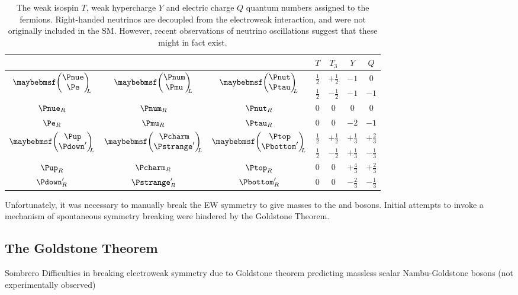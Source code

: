 \begin{table}
	\begin{tabular}{ccc@{\hskip 1cm}cccc}
		& & & $T$ & $T_3$ & $Y$ & $Q$ \\
		\hline
		\multirow{2}{*}{$\colvector{\Pnue\\ \Pe}_{\!\!\!L}$} & 
		\multirow{2}{*}{$\colvector{\Pnum\\ \Pmu}_{\!\!\!L}$} & 
		\multirow{2}{*}{$\colvector{\Pnut\\ \Ptau}_{\!\!\!L}$} & 
		$\tfrac{1}{2}$ & $+\tfrac{1}{2}$ & $-1$ & 0 \\
		& & & $\tfrac{1}{2}$ & $-\tfrac{1}{2}$ & $-1$ & $-1$ \\
		$\Pnue_R$ & $\Pnum_R$ & $\Pnut_R$ & 0 & 0 & 0 & 0 \\
		$\Pe_R$ & $\Pmu_R$ & $\Ptau_R$ & 0 & 0 & $-2$ & $-1$ \\
		\hline
		\multirow{2}{*}{$\colvector{\Pup\\ \Pdown'}_{\!\!\!L}$} & 
		\multirow{2}{*}{$\colvector{\Pcharm\\ \Pstrange'}_{\!\!\!L}$} & 
		\multirow{2}{*}{$\colvector{\Ptop\\ \Pbottom'}_{\!\!\!L}$} & 
		$\tfrac{1}{2}$ & $+\tfrac{1}{2}$ & $+\tfrac{1}{3}$ & $+\tfrac{2}{3}$ \\
		& & & $\tfrac{1}{2}$ & $-\tfrac{1}{2}$ & $+\tfrac{1}{3}$ & $-\tfrac{1}{3}$ \\
		$\Pup_R$ & $\Pcharm_R$ & $\Ptop_R$ & 0 & 0 & $+\tfrac{4}{3}$ & $+\tfrac{2}{3}$ \\
		$\Pdown'_R$ & $\Pstrange'_R$ & $\Pbottom'_R$ & 0 & 0 & $-\tfrac{2}{3}$ & $-\tfrac{1}{3}$ \\
	\end{tabular}
	\caption{The weak isospin $T$, weak hypercharge $Y$ and electric charge $Q$ quantum
	numbers assigned to the fermions. Right-handed neutrinos are decoupled from the 
	electroweak interaction, and were not originally included in the \ac{SM}. However, 
	recent observations of neutrino oscillations suggest that these might in fact exist.}
	\label{tab:ew_fermions}
\end{table}

Unfortunately, it was necessary to manually break the \ac{EW} symmetry to give masses to 
the \PWpm and \PZ bosons. Initial attempts to invoke a mechanism of spontaneous symmetry 
breaking were hindered by the Goldstone Theorem.



\subsection{The Goldstone Theorem}
\label{sec:ewsb:goldstone}
Sombrero
Difficulties in breaking electroweak symmetry due to Goldstone theorem predicting massless scalar Nambu-Goldstone bosons (not experimentally observed)

